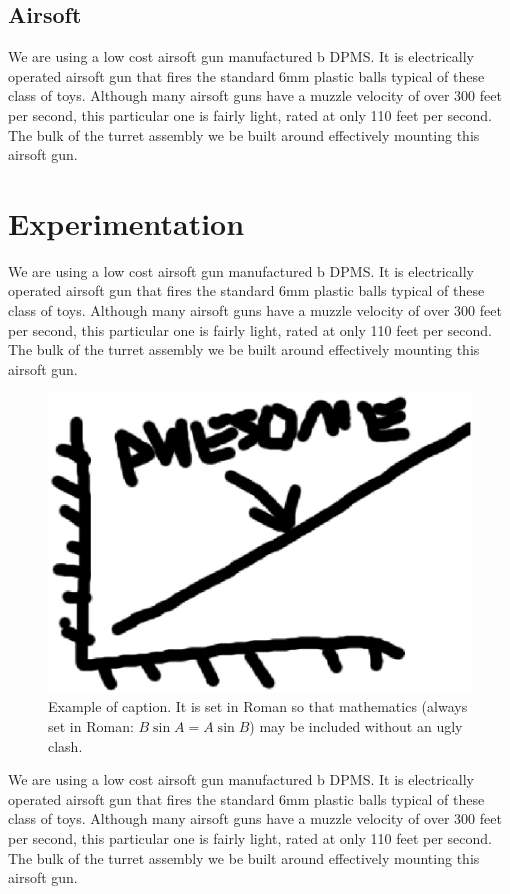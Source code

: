 \documentclass[10pt,twocolumn,letterpaper]{article}
\begin{document}
\subsection{Airsoft}
We are using a low cost airsoft gun manufactured b DPMS. It is electrically operated airsoft gun that fires the standard 6mm plastic balls typical of these class of toys. Although many airsoft guns have a muzzle velocity of over 300 feet per second, this particular one is fairly light, rated at only 110 feet per second. The bulk of the turret assembly we be built around effectively mounting this airsoft gun.


\section{Experimentation}
We are using a low cost airsoft gun manufactured b DPMS. It is electrically operated airsoft gun that fires the standard 6mm plastic balls typical of these class of toys. Although many airsoft guns have a muzzle velocity of over 300 feet per second, this particular one is fairly light, rated at only 110 feet per second. The bulk of the turret assembly we be built around effectively mounting this airsoft gun.

\begin{figure}[t]
\begin{center}
  \includegraphics[width=0.8\linewidth]{test_figure.eps}
\end{center}
   \caption{Example of caption.  It is set in Roman so that mathematics
   (always set in Roman: $B \sin A = A \sin B$) may be included without an
   ugly clash.}
\label{fig:long}
\label{fig:onecol}
\end{figure}


We are using a low cost airsoft gun manufactured b DPMS. It is electrically operated airsoft gun that fires the standard 6mm plastic balls typical of these class of toys. Although many airsoft guns have a muzzle velocity of over 300 feet per second, this particular one is fairly light, rated at only 110 feet per second. The bulk of the turret assembly we be built around effectively mounting this airsoft gun.
\end{document}
